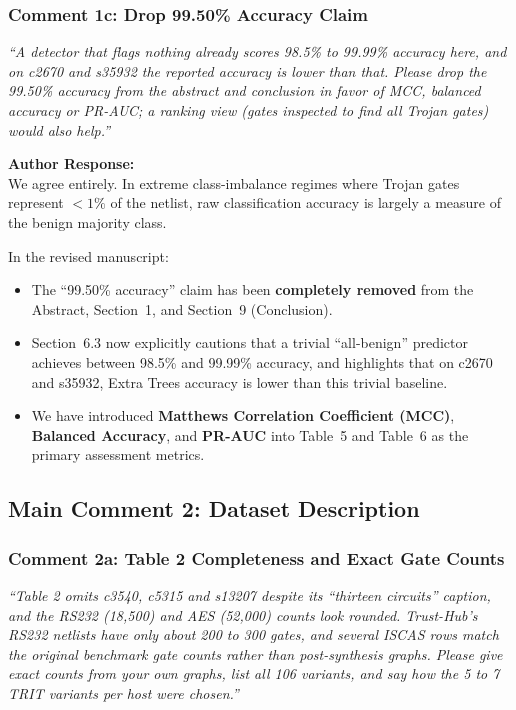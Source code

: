 \documentclass[11pt,a4paper]{article}
\newcommand{\reviewercomment}[1]{\vspace{4pt}\noindent\textcolor{revcomment}{\textit{``#1''}}\vspace{4pt}}
\newcommand{\authorresponse}{\noindent\textbf{Author Response:}}
\begin{document}
\subsubsection*{Comment 1c: Drop 99.50\% Accuracy Claim}

\reviewercomment{A detector that flags nothing already scores 98.5\% to 99.99\% accuracy here, and on c2670 and s35932 the reported accuracy is lower than that. Please drop the 99.50\% accuracy from the abstract and conclusion in favor of MCC, balanced accuracy or PR-AUC; a ranking view (gates inspected to find all Trojan gates) would also help.}

\authorresponse\\
We agree entirely. In extreme class-imbalance regimes where Trojan gates represent $<1\%$ of the netlist, raw classification accuracy is largely a measure of the benign majority class.

In the revised manuscript:
\begin{itemize}[leftmargin=*]
    \item The ``99.50\% accuracy'' claim has been \textbf{completely removed} from the Abstract, Section~1, and Section~9 (Conclusion).
    \item Section~6.3 now explicitly cautions that a trivial ``all-benign'' predictor achieves between 98.5\% and 99.99\% accuracy, and highlights that on c2670 and s35932, Extra Trees accuracy is lower than this trivial baseline.
    \item We have introduced \textbf{Matthews Correlation Coefficient (MCC)}, \textbf{Balanced Accuracy}, and \textbf{PR-AUC} into Table~5 and Table~6 as the primary assessment metrics.
\end{itemize}

\subsection*{Main Comment 2: Dataset Description}

\subsubsection*{Comment 2a: Table 2 Completeness and Exact Gate Counts}

\reviewercomment{Table 2 omits c3540, c5315 and s13207 despite its ``thirteen circuits'' caption, and the RS232 (18,500) and AES (52,000) counts look rounded. Trust-Hub's RS232 netlists have only about 200 to 300 gates, and several ISCAS rows match the original benchmark gate counts rather than post-synthesis graphs. Please give exact counts from your own graphs, list all 106 variants, and say how the 5 to 7 TRIT variants per host were chosen.}
\end{document}

